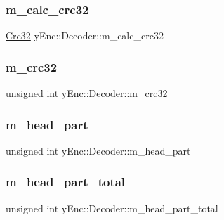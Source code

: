 \subsubsection{\texorpdfstring{m\+\_\+calc\+\_\+crc32}{m\_calc\_crc32}}
{\footnotesize\ttfamily \hyperlink{class_crc32}{Crc32} y\+Enc\+::\+Decoder\+::m\+\_\+calc\+\_\+crc32\hspace{0.3cm}{\ttfamily [protected]}}

\hypertarget{classy_enc_1_1_decoder_a623c6d2e689b8f869e939d03d9673271}{}\label{classy_enc_1_1_decoder_a623c6d2e689b8f869e939d03d9673271} 
\subsubsection{\texorpdfstring{m\+\_\+crc32}{m\_crc32}}
{\footnotesize\ttfamily unsigned int y\+Enc\+::\+Decoder\+::m\+\_\+crc32\hspace{0.3cm}{\ttfamily [protected]}}

\hypertarget{classy_enc_1_1_decoder_a2365fd29009a7b4151435445080c5706}{}\label{classy_enc_1_1_decoder_a2365fd29009a7b4151435445080c5706} 
\subsubsection{\texorpdfstring{m\+\_\+head\+\_\+part}{m\_head\_part}}
{\footnotesize\ttfamily unsigned int y\+Enc\+::\+Decoder\+::m\+\_\+head\+\_\+part\hspace{0.3cm}{\ttfamily [protected]}}

\hypertarget{classy_enc_1_1_decoder_a4d4f443127e17bd65927824ce1eef3a6}{}\label{classy_enc_1_1_decoder_a4d4f443127e17bd65927824ce1eef3a6} 
\subsubsection{\texorpdfstring{m\+\_\+head\+\_\+part\+\_\+total}{m\_head\_part\_total}}
{\footnotesize\ttfamily unsigned int y\+Enc\+::\+Decoder\+::m\+\_\+head\+\_\+part\+\_\+total\hspace{0.3cm}{\ttfamily [protected]}}

